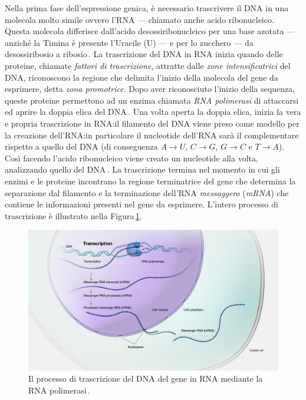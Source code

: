 Nella prima fase dell'espressione genica, è necessario trascrivere il DNA in una molecola molto simile ovvero l'RNA — chiamato anche acido ribonucleico. Questa molecola differisce dall'acido desossiribonucleico per una base azotata — anziché la Timina è presente l'Uracile (U) — e per lo zucchero — da desossiribosio a ribosio\,\cite{alberts2002dna}. La trascrizione del DNA in RNA inizia quando delle proteine, chiamate \textsl{fattori di trascrizione}, attratte dalle \textsl{zone intensificatrici} del DNA, riconoscono la regione che delimita l'inizio della molecola del gene da esprimere, detta \textsl{zona promotrice}. Dopo aver riconosciuto l'inizio della sequenza, queste proteine permettono ad un enzima chiamata \textsl{RNA polimerasi} di attaccarsi ed aprire la doppia elica del DNA\,\cite{cramer2019organization}. Una volta aperta la doppia elica, inizia la vera e propria trascrizione in RNA:\@ il filamento del DNA viene preso come modello per la creazione dell'RNA;\@ in particolare il nucleotide dell'RNA sarà il complementare rispetto a quello del DNA (di conseguenza $A\rightarrow U$, $C\rightarrow G$, $G\rightarrow C$ e $T\rightarrow A$). Così facendo l'acido ribonucleico viene creato un nucleotide alla volta, analizzando quello del DNA\,\cite{alberts2002dna}. La trascrizione termina nel momento in cui gli enzimi e le proteine incontrano la regione terminatrice del gene che determina la separazione dal filamento e la terminazione dell'RNA \textsl{messaggero} (\textsl{mRNA}) che contiene le informazioni presenti nel gene da esprimere. L'intero processo di trascrizione è illustrato nella Figura\,\ref{fig:dna-transcription}.

\begin{figure}[b!]
    \centering
    \includegraphics[width=\textwidth]{assets/dna-transcription.jpg}
    \caption[Il processo di trascrizione del DNA in RNA.]{Il processo di trascrizione del DNA del gene in RNA mediante la RNA polimerasi\,\cite{nhgri_transcription_image}.}\label{fig:dna-transcription}
\end{figure}

